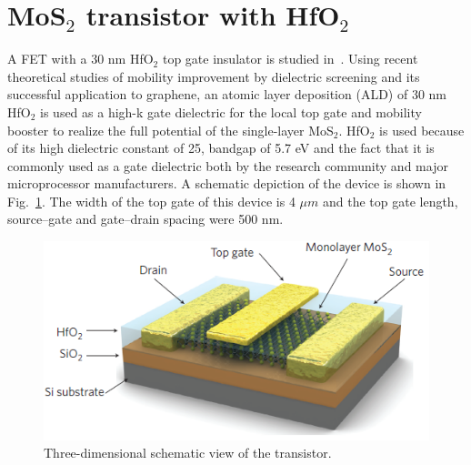 \documentclass[12pt,a4paper,titlepage]{article}
\begin{document}
\section{MoS$_2$ transistor with HfO$_2$}
A FET with a 30 nm HfO$_2$ top gate insulator is studied in~\cite{Radisavljevic:Si_MoS2}. Using recent theoretical studies of mobility improvement by dielectric screening and its successful application to graphene, an atomic layer deposition (ALD) of 30 nm HfO$_2$ is used as a high-k gate dielectric for the
local top gate and mobility booster to realize the full potential of the single-layer MoS$_2$. HfO$_2$ is used because of its high dielectric constant of 25, bandgap of 5.7 eV and the fact that it is commonly used as a gate dielectric both by the research community and major microprocessor manufacturers. A schematic depiction of the device is shown in Fig.~\ref{fig:HfO2_fabrication}. The width of the top gate of this device is 4 $\mu m$ and the top gate length, source–gate and gate–drain spacing were 500 nm.

\begin{figure}[h]
	\centering
	\includegraphics[width=.8\textwidth]{Immagini/HfO2_fabrication.png} 
	\caption{Three-dimensional schematic view of the transistor.~\cite{Radisavljevic:Si_MoS2}}
	\label{fig:HfO2_fabrication}
\end{figure} 
\end{document}
